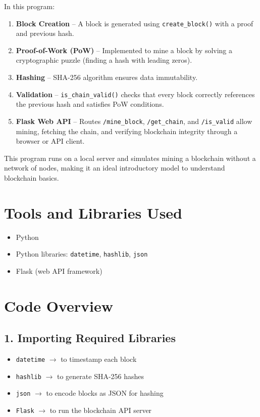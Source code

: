 \documentclass[12pt,a4paper]{article}
\begin{document}
In this program:
\begin{enumerate}[label=\arabic*., leftmargin=*]
    \item \textbf{Block Creation} -- A block is generated using \texttt{create\_block()} with a proof and previous hash.
    \item \textbf{Proof-of-Work (PoW)} -- Implemented to mine a block by solving a cryptographic puzzle (finding a hash with leading zeros).
    \item \textbf{Hashing} -- SHA-256 algorithm ensures data immutability.
    \item \textbf{Validation} -- \texttt{is\_chain\_valid()} checks that every block correctly references the previous hash and satisfies PoW conditions.
    \item \textbf{Flask Web API} -- Routes \texttt{/mine\_block}, \texttt{/get\_chain}, and \texttt{/is\_valid} allow mining, fetching the chain, and verifying blockchain integrity through a browser or API client.
\end{enumerate}

This program runs on a local server and simulates mining a blockchain without a network of nodes, making it an ideal introductory model to understand blockchain basics.

\section{Tools and Libraries Used}
\begin{itemize}
    \item Python
    \item Python libraries: \texttt{datetime}, \texttt{hashlib}, \texttt{json}
    \item Flask (web API framework)
\end{itemize}

\section{Code Overview}

\subsection{1. Importing Required Libraries}
\begin{itemize}
    \item \texttt{datetime} $\rightarrow$ to timestamp each block
    \item \texttt{hashlib} $\rightarrow$ to generate SHA-256 hashes
    \item \texttt{json} $\rightarrow$ to encode blocks as JSON for hashing
    \item \texttt{Flask} $\rightarrow$ to run the blockchain API server
\end{itemize}
\end{document}
